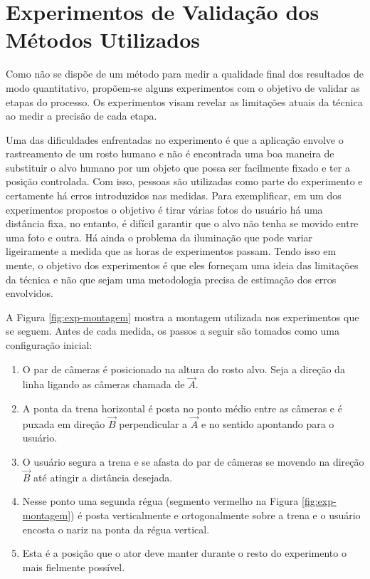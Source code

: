 

\section{Experimentos de Validação dos Métodos Utilizados}

Como não se dispõe de um método para medir a qualidade final dos resultados de
modo quantitativo, propõem-se alguns experimentos com o objetivo de validar as
etapas do processo. Os experimentos visam revelar as limitações atuais da
técnica ao medir a precisão de cada etapa.

Uma das dificuldades enfrentadas no experimento é que a aplicação envolve o
rastreamento de um rosto humano e não é encontrada uma boa maneira de substituir
o alvo humano por um objeto que possa ser facilmente fixado e ter a posição
controlada. Com isso, pessoas são utilizadas como parte do experimento e
certamente há erros introduzidos nas medidas. Para exemplificar, em um dos
experimentos propostos o objetivo é tirar várias fotos do usuário há uma
distância fixa, no entanto, é difícil garantir que o alvo não tenha se movido
entre uma foto e outra. Há ainda o problema da iluminação que pode variar
ligeiramente a medida que as horas de experimentos passam. Tendo isso em mente,
o objetivo dos experimentos é que eles forneçam uma ideia das limitações da
técnica e não que sejam uma metodologia precisa de estimação dos erros
envolvidos.

A Figura \ref{fig:exp-montagem} mostra a montagem utilizada nos experimentos que
se seguem. Antes de cada medida, os passos a seguir são tomados como uma
configuração inicial:

\begin{enumerate}

\item O par de câmeras é posicionado na altura do rosto alvo. Seja a direção da
  linha ligando as câmeras chamada de $\vec{A}$.

\item A ponta da trena horizontal é posta no ponto médio entre as câmeras e é
  puxada em direção $\vec{B}$ perpendicular a $\vec{A}$ e no sentido apontando
  para o usuário.

\item O usuário segura a trena e se afasta do par de câmeras se movendo na
  direção $\vec{B}$ até atingir a distância desejada.

\item Nesse ponto uma segunda régua (segmento vermelho na Figura
  \ref{fig:exp-montagem}) é posta verticalmente e ortogonalmente sobre a trena e
  o usuário encosta o nariz na ponta da régua vertical. 

\item Esta é a posição que o ator deve manter durante o resto do experimento o
  mais fielmente possível.

\end{enumerate}

